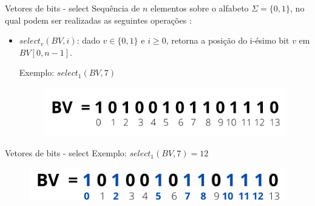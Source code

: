     \begin{frame}{Vetores de bits - select}
    Sequência de $n$ elementos sobre o alfabeto $\Sigma = \{0,1\}$, no qual podem ser realizadas as seguintes operações \citep{book-compact-data-structures}:
        \vspace{0.5cm}
        \begin{itemize} 
              \item $select_v(BV,i)$: dado $v \in \{0,1\}$ e $i \geq 0$, retorna a posição do i-ésimo bit $v$ em $BV[0,n-1]$.
              \vspace{0.5cm}
            
                Exemplo: $select_1(BV,7)$
            
                \begin{figure}[h!]
                    \centering
                    \includegraphics[scale=0.5]{images/bitvector.png}
                \end{figure} 
        \end{itemize}
    \end{frame}
    
    \begin{frame}{Vetores de bits - select}
        Exemplo: $select_1(BV,7)=12$
        \begin{figure}[h!]
            \centering
            \includegraphics[scale=0.7]{images/select-res.png}
        \end{figure} 
    \end{frame}